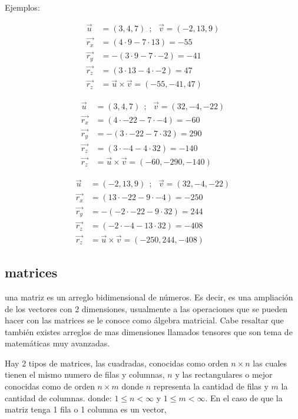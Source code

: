     Ejemplos:

    \begin{align*}
        \vec{u}& =(3,4,7)   \ \ ;\ \ \  \vec{v} =(-2,13,9)		\\
        \vec{r_x}& = (4\cdot 9- 7\cdot 13) = -55 \\
        \vec{r_y}&= -(3\cdot 9- 7\cdot -2)= -41 \\
        \vec{r_z}&= (3\cdot 13- 4\cdot -2) = 47 \\
        \vec{r_z}&= \vec{u}\times\vec{v} = (-55,-41,47)
    \end{align*}

    \begin{align*}
        \vec{u}& =(3,4,7)  \ \ ;\ \ \  \vec{v} =(32,-4,-22)		\\
        \vec{r_x}& = (4\cdot -22 - 7\cdot -4)= -60\\
        \vec{r_y}&= -(3\cdot -22- 7\cdot 32) =290\\
        \vec{r_z}&= (3\cdot -4- 4\cdot 32) = -140\\
        \vec{r_z}&= \vec{u}\times\vec{v} = (-60,-290,-140)
    \end{align*}

    \begin{align*}
        \vec{u}& =(-2,13,9)  \ \ ;\ \ \   \vec{v} =(32,-4,-22)		\\
        \vec{r_x}& = (13\cdot -22- 9\cdot -4)= -250\\
        \vec{r_y}&= -(-2\cdot -22- 9\cdot 32)= 244\\
        \vec{r_z}&= (-2\cdot -4- 13\cdot 32) =-408\\
        \vec{r_z}&= \vec{u}\times\vec{v} = (-250, 244, -408)
    \end{align*}




\subsection{matrices}

una matriz es un arreglo bidimensional de números. Es decir, es una ampliación de
los vectores con 2 dimensiones, usualmente a las operaciones que se pueden hacer
con las matrices se le conoce como álgebra matricial. Cabe resaltar que también
existes arreglos de mas dimensiones llamados tensores que son tema de matemáticas
muy avanzadas.

Hay 2 tipos de matrices, las cuadradas, conocidas como orden $n\times n$ las
cuales tienen el mismo numero de filas y columnas, $n$
y las rectangulares o mejor conocidas como de orden $n\times m$ donde $n$
representa la cantidad de filas y $m$ la cantidad de columnas. donde:
$ 1\leq  n < \infty$ y  $ 1\leq m < \infty$.
En el caso de que la matriz tenga 1 fila o 1 columna es un vector,

